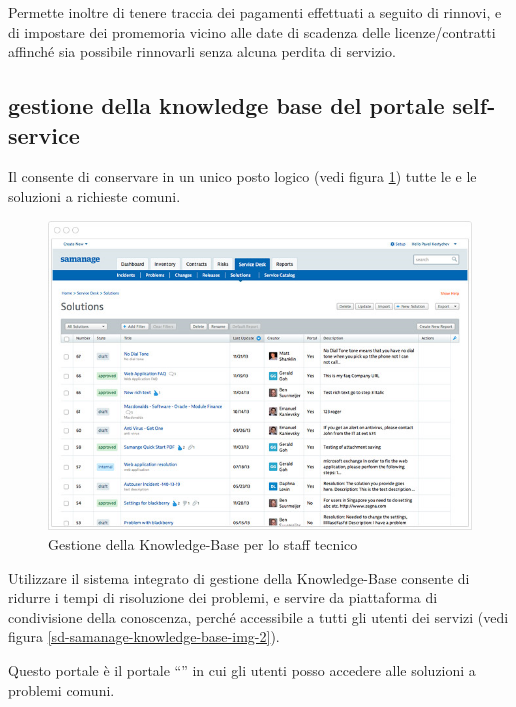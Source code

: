 Permette inoltre di tenere traccia dei pagamenti effettuati a seguito di rinnovi, e di impostare dei promemoria vicino alle date di scadenza delle licenze/contratti affinché sia possibile rinnovarli senza alcuna perdita di servizio.

\subsection[Gestione della Knowledge Base e del portale self-service]{gestione della knowledge base del portale self-service}
\label{sd-samanage-knowledge-base}
Il  consente di conservare in un unico posto logico (vedi figura \ref{sd-samanage-knowledge-base-img-1}) tutte le  e le soluzioni a richieste comuni.

\begin{figure}[htbp]
\centering
\includegraphics[scale=0.6]{Images/samanage/Knowledge_base.png}
\caption{Gestione della \ac{Knowledge-Base} per lo staff tecnico}
\label{sd-samanage-knowledge-base-img-1}
\end{figure}

Utilizzare il sistema integrato di gestione della \ac{Knowledge-Base} consente di ridurre i tempi di risoluzione dei problemi, e servire da piattaforma di condivisione della conoscenza, perché accessibile a tutti gli utenti dei servizi (vedi figura \ref{sd-samanage-knowledge-base-img-2}). 

Questo portale è il portale ``'' in cui gli utenti posso accedere alle soluzioni a problemi comuni.

